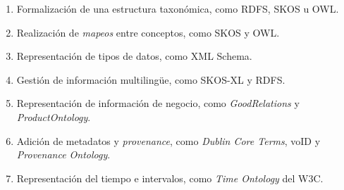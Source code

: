 \begin{enumerate}
 \item Formalización de una estructura taxonómica, como RDFS, \gls{SKOS} u \gls{OWL}.
 \item Realización de \textit{mapeos} entre conceptos, como SKOS y OWL.
 \item Representación de tipos de datos, como \gls{XML Schema}.
 \item Gestión de información multiling\"{u}e, como \gls{SKOS-XL} y RDFS.
 \item Representación de información de negocio, como \textit{GoodRelations} y \textit{ProductOntology}.
 \item Adición de metadatos y \textit{provenance}, como \textit{Dublin Core Terms}, \gls{voID} y \textit{Provenance Ontology}.
 \item Representación del tiempo e intervalos, como \textit{Time Ontology} del \gls{W3C}.
\end{enumerate}



